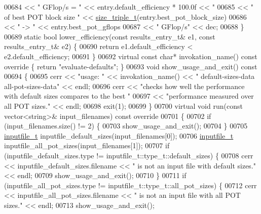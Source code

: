 \begin{DoxyCode}
{{{{{00684       << \textcolor{stringliteral}{" GFlop/s = "} << entry.default\_efficiency * 100.0f << \textcolor{stringliteral}{" %
00685       << \textcolor{stringliteral}{" of best POT block size "} << \hyperlink{structsize__triple__t}{size\_triple\_t}(entry.best\_pot\_block\_size)
00686       << \textcolor{stringliteral}{" -> "} << entry.best\_pot\_gflops
00687       << \textcolor{stringliteral}{" GFlop/s"} << dec;
00688   \}
00689   \textcolor{keyword}{static} \textcolor{keywordtype}{bool} lower\_efficiency(\textcolor{keyword}{const} results\_entry\_t& e1, \textcolor{keyword}{const} results\_entry\_t& e2) \{
00690     \textcolor{keywordflow}{return} e1.default\_efficiency < e2.default\_efficiency;
00691   \}
00692   \textcolor{keyword}{virtual} \textcolor{keyword}{const} \textcolor{keywordtype}{char}* invokation\_name()\textcolor{keyword}{ const override }\{ \textcolor{keywordflow}{return} \textcolor{stringliteral}{"evaluate-defaults"}; \}
00693   \textcolor{keywordtype}{void} show\_usage\_and\_exit()\textcolor{keyword}{ const}
00694 \textcolor{keyword}{  }\{
00695     cerr << \textcolor{stringliteral}{"usage: "} << invokation\_name() << \textcolor{stringliteral}{" default-sizes-data all-pot-sizes-data"} << endl;
00696     cerr << \textcolor{stringliteral}{"checks how well the performance with default sizes compares to the best "}
00697          << \textcolor{stringliteral}{"performance measured over all POT sizes."} << endl;
00698     exit(1);
00699   \}
00700   \textcolor{keyword}{virtual} \textcolor{keywordtype}{void} run(\textcolor{keyword}{const} vector<string>& input\_filenames)\textcolor{keyword}{ const override}
00701 \textcolor{keyword}{  }\{
00702     \textcolor{keywordflow}{if} (input\_filenames.size() != 2) \{
00703       show\_usage\_and\_exit();
00704     \}
00705     \hyperlink{structinputfile__t}{inputfile\_t} inputfile\_default\_sizes(input\_filenames[0]);
00706     \hyperlink{structinputfile__t}{inputfile\_t} inputfile\_all\_pot\_sizes(input\_filenames[1]);
00707     \textcolor{keywordflow}{if} (inputfile\_default\_sizes.type != inputfile\_t::type\_t::default\_sizes) \{
00708       cerr << inputfile\_default\_sizes.filename << \textcolor{stringliteral}{" is not an input file with default sizes."} << endl;
00709       show\_usage\_and\_exit();
00710     \}
00711     \textcolor{keywordflow}{if} (inputfile\_all\_pot\_sizes.type != inputfile\_t::type\_t::all\_pot\_sizes) \{
00712       cerr << inputfile\_all\_pot\_sizes.filename << \textcolor{stringliteral}{" is not an input file with all POT sizes."} << endl;
00713       show\_usage\_and\_exit();
}}}}}}
\end{DoxyCode}
